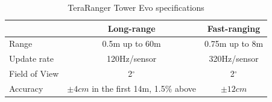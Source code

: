 \begin{table}[ht]
	\footnotesize
	\centering
	\begin{tabular}{ l c c }
		\toprule
		                & Long-range                                & Fast-ranging \\
		\midrule
		Range           & 0.5m up to 60m                            & 0.75m up to 8m \\
		Update rate     & 120Hz/sensor                              & 320Hz/sensor\\
		Field of View   & 2$^{\circ}$                                        & 2$^{\circ}$\\
		Accuracy        & $\pm 4cm$ in the first 14m, 1.5\% above   & $\pm 12cm$\\
		\bottomrule
	\end{tabular}
	\caption{TeraRanger Tower Evo specifications}
	\label{tab:tera_ranger_features}
\end{table}

